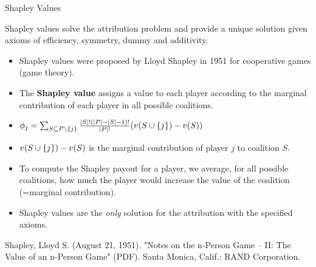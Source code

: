 \documentclass[11pt,compress,t,notes=noshow, xcolor=table]{beamer}
\begin{document}
\begin{vbframe}{Shapley Values}

  Shapley values solve the attribution problem and provide a unique solution given axioms of efficiency, symmetry, dummy and additivity.
\begin{itemize}
  \item Shapley values were proposed by Lloyd Shapley in 1951 for cooperative games (game theory).
  \item The \textbf{Shapley value} assigns a value to each player according to the marginal contribution of each player in all possible coalitions.
  \item $\phi_j = \sum_{\SsubPnoj} \frac{|S|!(|P| - |S| - 1)!}{|P|!}(v(\Scupj) - v(S))$
  \item $v(\Scupj) - v(S)$ is the marginal contribution of player $j$ to coalition $S$.
  \item To compute the Shapley payout for a player, we average, for all possible coalitions, how much the player would increase the value of the coalition (=marginal contribution).
  \item Shapley values are the \textit{only} solution for the attribution with the specified axioms.
\end{itemize}

\tiny{ Shapley, Lloyd S. (August 21, 1951). "Notes on the n-Person Game -- II: The Value of an n-Person Game" (PDF). Santa Monica, Calif.: RAND Corporation.}

\end{vbframe}
\end{document}
